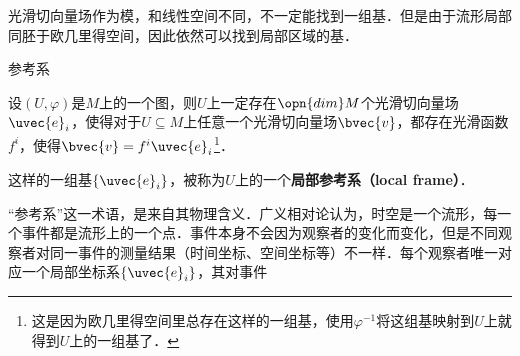 光滑切向量场作为模，和线性空间不同，不一定能找到一组基．但是由于流形局部同胚于欧几里得空间，因此依然可以找到局部区域的基．


\begin{definition}{参考系}

设$(U, \varphi)$是$M$上的一个图，则$U$上一定存在$\opn{dim}M$个光滑切向量场$\uvec{e}_i$，使得对于$U\subseteq M$上任意一个光滑切向量场$\bvec{v}$，都存在光滑函数$f^i$，使得$\bvec{v}=f^i\uvec{e}_i$\footnote{这是因为欧几里得空间里总存在这样的一组基，使用$\varphi^{-1}$将这组基映射到$U$上就得到$U$上的一组基了．}．

这样的一组基$\{\uvec{e}_i\}$，被称为$U$上的一个\textbf{局部参考系（local frame）}．

\end{definition}

“参考系”这一术语，是来自其物理含义．广义相对论认为，时空是一个流形，每一个事件都是流形上的一个点．事件本身不会因为观察者的变化而变化，但是不同观察者对同一事件的测量结果（时间坐标、空间坐标等）不一样．每个观察者唯一对应一个局部坐标系$\{\uvec{e}_i\}$，其对事件











